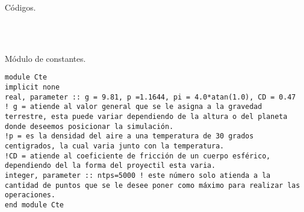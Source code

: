 \documentclass[12pt]{article}
\begin{document}
\newpage
\begin{LARGE}
Códigos.
\end{LARGE} 
\\
\\\begin{large}
Módulo de constantes.
\end{large}
\begin{verbatim}
module Cte
implicit none 
real, parameter :: g = 9.81, p =1.1644, pi = 4.0*atan(1.0), CD = 0.47
! g = atiende al valor general que se le asigna a la gravedad terrestre, esta puede variar dependiendo de la altura o del planeta donde deseemos posicionar la simulación.
!p = es la densidad del aire a una temperatura de 30 grados centigrados, la cual varia junto con la temperatura.
!CD = atiende al coeficiente de fricción de un cuerpo esférico, dependiendo del la forma del proyectil esta varia.
integer, parameter :: ntps=5000 ! este número solo atienda a la cantidad de puntos que se le desee poner como máximo para realizar las operaciones.
end module Cte
\end{verbatim}
\end{document}
